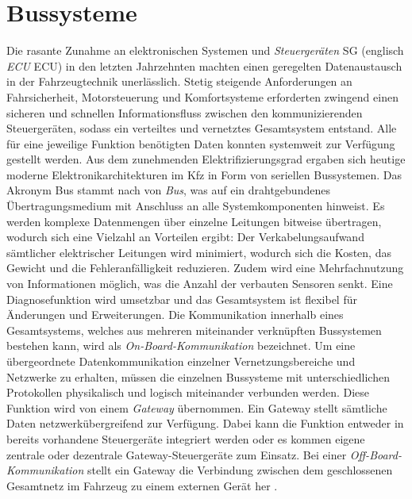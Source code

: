 \section{Bussysteme} \label{sec:Bussysteme}
Die rasante Zunahme an elektronischen Systemen und \emph{Steuergeräten} \acs{SG} (englisch \emph{\acl{ECU}} \acs{ECU}) in den letzten Jahrzehnten machten einen geregelten Datenaustausch in der Fahrzeugtechnik unerlässlich. Stetig steigende Anforderungen an Fahrsicherheit, Motorsteuerung und Komfortsysteme erforderten zwingend einen sicheren und schnellen Informationsfluss zwischen den kommunizierenden Steuergeräten, sodass ein verteiltes und vernetztes Gesamtsystem entstand. Alle für eine jeweilige Funktion benötigten Daten konnten systemweit zur Verfügung gestellt werden. Aus dem zunehmenden Elektrifizierungsgrad ergaben sich heutige moderne Elektronikarchitekturen im Kfz in Form von seriellen Bussystemen. Das Akronym \acs{Bus} stammt \cite{Klumann.2000} nach von \emph{\acl{Bus}}, was auf ein drahtgebundenes Übertragungsmedium mit Anschluss an alle Systemkomponenten hinweist. Es werden komplexe Datenmengen über einzelne Leitungen bitweise übertragen, wodurch sich eine Vielzahl an Vorteilen ergibt: Der Verkabelungsaufwand sämtlicher elektrischer Leitungen wird minimiert, wodurch sich die Kosten, das Gewicht und die Fehleranfälligkeit reduzieren. Zudem wird eine Mehrfachnutzung von Informationen möglich, was die Anzahl der verbauten Sensoren senkt. Eine Diagnosefunktion wird umsetzbar und das Gesamtsystem ist flexibel für Änderungen und Erweiterungen. Die Kommunikation innerhalb eines Gesamtsystems, welches aus mehreren miteinander verknüpften Bussystemen bestehen kann, wird als \emph{On-Board-Kommunikation} bezeichnet. Um eine übergeordnete Datenkommunikation einzelner Vernetzungsbereiche und Netzwerke zu erhalten, müssen die einzelnen Bussysteme mit unterschiedlichen Protokollen physikalisch und logisch miteinander verbunden werden. Diese Funktion wird von einem \emph{Gateway} übernommen. Ein Gateway stellt sämtliche Daten netzwerkübergreifend zur Verfügung. Dabei kann die Funktion entweder in bereits vorhandene Steuergeräte integriert werden oder es kommen eigene zentrale oder dezentrale Gateway-Steuergeräte zum Einsatz. Bei einer \emph{Off-Board-Kommunikation} stellt ein Gateway die Verbindung zwischen dem geschlossenen Gesamtnetz im Fahrzeug zu einem externen Gerät her \cite{VectorInformatikGmbH.b}. \\

